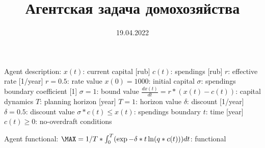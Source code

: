 \documentclass{a_model}
\title{Агентская задача домохозяйства}
\date{19.04.2022}
\begin{document}
Agent description:
    $x(t)$: current capital [rub]
    $c(t)$: spendings [rub]
    $r$: effective rate [1/year]
    $r= 0.5$: rate value
    $x(0) = 1000$: initial capital
    $\sigma$: spendings boundary coefficient [1]
    $\sigma = 1$: bound value
    $\frac{dx(t)}{dt} = r*(x(t)-c(t))$: capital dynamics
    $T$: planning horizon [year]
    $T = 1$: horizon value
    $\delta$: discount  [1/year]
    $\delta = 0.5$: discount value
    $\sigma*c(t)\leq x(t)$: spendings boundary
    $t$: time [year]
    $c(t) \geq 0$: no-overdraft conditions

Agent functional:
    $\MAX = 1/T * \int_0^T (\exp{-\delta*t} \ln(q*c(t)))dt$: functional
\end{document}
